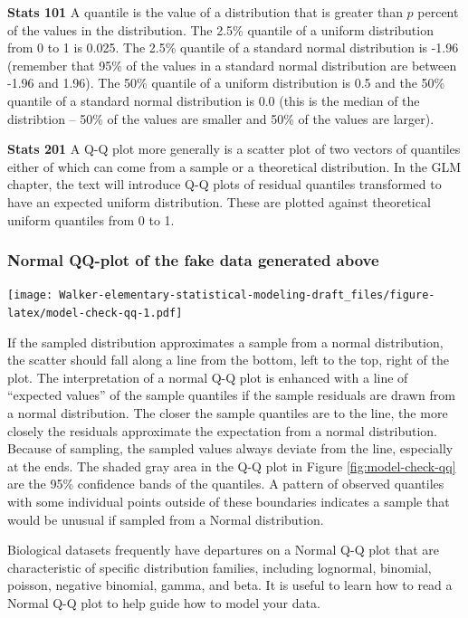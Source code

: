 \documentclass[]{book}
\begin{document}
\textbf{Stats 101} A quantile is the value of a distribution that is greater than \(p\) percent of the values in the distribution. The 2.5\% quantile of a uniform distribution from 0 to 1 is 0.025. The 2.5\% quantile of a standard normal distribution is -1.96 (remember that 95\% of the values in a standard normal distribution are between -1.96 and 1.96). The 50\% quantile of a uniform distribution is 0.5 and the 50\% quantile of a standard normal distribution is 0.0 (this is the median of the distribtion -- 50\% of the values are smaller and 50\% of the values are larger).

\textbf{Stats 201} A Q-Q plot more generally is a scatter plot of two vectors of quantiles either of which can come from a sample or a theoretical distribution. In the GLM chapter, the text will introduce Q-Q plots of residual quantiles transformed to have an expected uniform distribution. These are plotted against theoretical uniform quantiles from 0 to 1.

\hypertarget{normal-qq-plot-of-the-fake-data-generated-above}{%
\subsubsection{Normal QQ-plot of the fake data generated above}\label{normal-qq-plot-of-the-fake-data-generated-above}}

\texttt{[image: Walker-elementary-statistical-modeling-draft\_files/figure-latex/model-check-qq-1.pdf]}

If the sampled distribution approximates a sample from a normal distribution, the scatter should fall along a line from the bottom, left to the top, right of the plot. The interpretation of a normal Q-Q plot is enhanced with a line of ``expected values'' of the sample quantiles if the sample residuals are drawn from a normal distribution. The closer the sample quantiles are to the line, the more closely the residuals approximate the expectation from a normal distribution. Because of sampling, the sampled values always deviate from the line, especially at the ends. The shaded gray area in the Q-Q plot in Figure \ref{fig:model-check-qq} are the 95\% confidence bands of the quantiles. A pattern of observed quantiles with some individual points outside of these boundaries indicates a sample that would be unusual if sampled from a Normal distribution.

Biological datasets frequently have departures on a Normal Q-Q plot that are characteristic of specific distribution families, including lognormal, binomial, poisson, negative binomial, gamma, and beta. It is useful to learn how to read a Normal Q-Q plot to help guide how to model your data.
\end{document}
